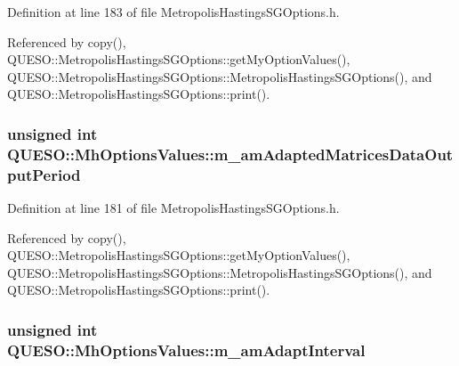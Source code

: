 Definition at line 183 of file Metropolis\-Hastings\-S\-G\-Options.\-h.



Referenced by copy(), Q\-U\-E\-S\-O\-::\-Metropolis\-Hastings\-S\-G\-Options\-::get\-My\-Option\-Values(), Q\-U\-E\-S\-O\-::\-Metropolis\-Hastings\-S\-G\-Options\-::\-Metropolis\-Hastings\-S\-G\-Options(), and Q\-U\-E\-S\-O\-::\-Metropolis\-Hastings\-S\-G\-Options\-::print().

\hypertarget{class_q_u_e_s_o_1_1_mh_options_values_a9e9de50014cce9683774d42119a1b752}{
\subsubsection[{m\-\_\-am\-Adapted\-Matrices\-Data\-Output\-Period}]{\setlength{\rightskip}{0pt plus 5cm}unsigned int Q\-U\-E\-S\-O\-::\-Mh\-Options\-Values\-::m\-\_\-am\-Adapted\-Matrices\-Data\-Output\-Period}}\label{class_q_u_e_s_o_1_1_mh_options_values_a9e9de50014cce9683774d42119a1b752}


Definition at line 181 of file Metropolis\-Hastings\-S\-G\-Options.\-h.



Referenced by copy(), Q\-U\-E\-S\-O\-::\-Metropolis\-Hastings\-S\-G\-Options\-::get\-My\-Option\-Values(), Q\-U\-E\-S\-O\-::\-Metropolis\-Hastings\-S\-G\-Options\-::\-Metropolis\-Hastings\-S\-G\-Options(), and Q\-U\-E\-S\-O\-::\-Metropolis\-Hastings\-S\-G\-Options\-::print().

\hypertarget{class_q_u_e_s_o_1_1_mh_options_values_a5cda43f7f5361c56eab4c036c9bcab5d}{
\subsubsection[{m\-\_\-am\-Adapt\-Interval}]{\setlength{\rightskip}{0pt plus 5cm}unsigned int Q\-U\-E\-S\-O\-::\-Mh\-Options\-Values\-::m\-\_\-am\-Adapt\-Interval}}\label{class_q_u_e_s_o_1_1_mh_options_values_a5cda43f7f5361c56eab4c036c9bcab5d}


